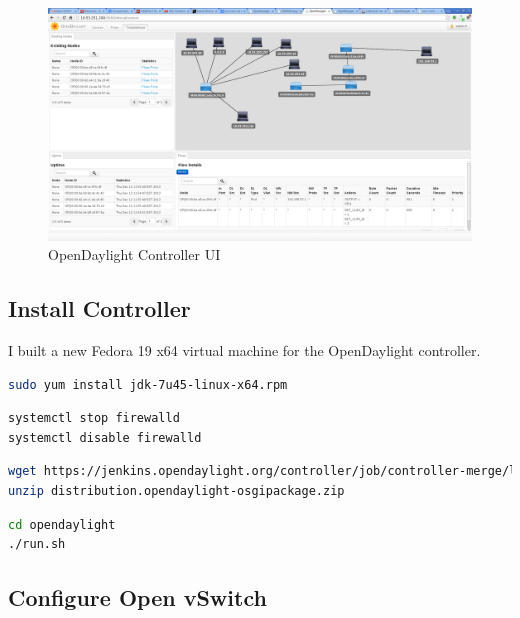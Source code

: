 \documentclass[11pt,letterpaper,oneside]{book}
\begin{document}
\begin{figure}[H]
	\caption{OpenDaylight Controller UI}
	\centering
	\label{fig:opendaylight_ctrl_ui}
	\includegraphics[scale=0.25]{./pictures/OpenDaylightController.png}
\end{figure}


\subsection{Install Controller}
I built a new Fedora 19 x64 virtual machine for the OpenDaylight controller.   


\begin{lstlisting}[caption={Install Oracle Java JDK},language=bash]
sudo yum install jdk-7u45-linux-x64.rpm
\end{lstlisting}
\begin{lstlisting}[caption={Disable firewalld},language=bash]
systemctl stop firewalld
systemctl disable firewalld
\end{lstlisting}
\begin{lstlisting}[caption={Get the latest controller},language=bash]
wget https://jenkins.opendaylight.org/controller/job/controller-merge/lastSuccessfulBuild/artifact/opendaylight/distribution/opendaylight/target/distribution.opendaylight-osgipackage.zip
unzip distribution.opendaylight-osgipackage.zip
\end{lstlisting}
\begin{lstlisting}[caption={Start the controller},language=bash]
cd opendaylight
./run.sh
\end{lstlisting}

\subsection{Configure Open vSwitch}
\end{document}
